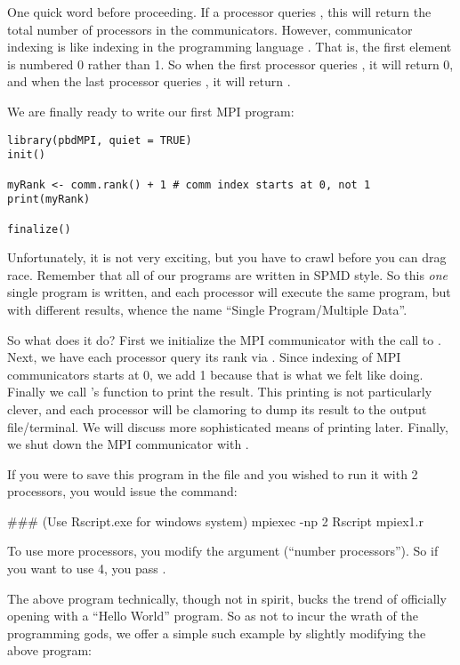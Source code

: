 One quick word before proceeding.  If a processor queries , this will return the total number of processors in the communicators.  However, communicator indexing is like indexing in the programming language .  That is, the first element is numbered 0 rather than 1.  So when the first processor queries , it will return 0, and when the last processor queries , it will return .
  
We are finally ready to write our first MPI program:

\begin{lstlisting}[language=rr,title=Simple pbdMPI Example 1]
library(pbdMPI, quiet = TRUE)
init()

myRank <- comm.rank() + 1 # comm index starts at 0, not 1
print(myRank)

finalize()
\end{lstlisting}

Unfortunately, it is not very exciting, but you have to crawl before you can drag race.  Remember that all of our programs are written in SPMD style.  So this \emph{one} single program is written, and each processor will execute the same program, but with different results, whence the name ``Single Program/Multiple Data''.  

So what does it do?  First we initialize the MPI communicator with the call to .  Next, we have each processor query its rank via .  Since indexing of MPI communicators starts at 0, we add 1 because that is what we felt like doing.  Finally we call 's  function to print the result.  This printing is not particularly clever, and each processor will be clamoring to dump its result to the output file/terminal.  We will discuss more sophisticated means of printing later.  Finally, we shut down the MPI communicator with .

If you were to save this program in the file  and you wished to run it with 2 processors, you would issue the command:

\begin{Command}
### (Use Rscript.exe for windows system)
mpiexec -np 2 Rscript mpiex1.r
\end{Command}

To use more processors, you modify the  argument (``number processors'').  So if you want to use 4, you pass .

The above program technically, though not in spirit, bucks the trend of officially opening with a ``Hello World'' program.  So as not to incur the wrath of the programming gods, we offer a simple such example by slightly modifying the above program:

